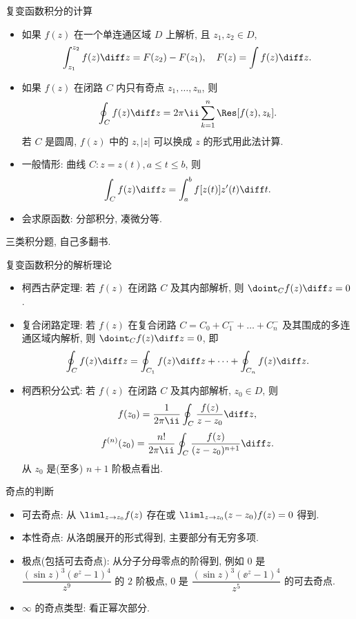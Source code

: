 \documentclass[aspectratio=169,handout]{ctexbeamer}
\begin{document}
\begin{frame}{复变函数积分的计算}
	\beqskip{3pt}
	\begin{itemize}
		\item 如果 $f(z)$ 在一个单连通区域 $D$ 上解析, 且 $z_1,z_2\in D$,
	\[
			\int_{z_1}^{z_2}f(z)\diff z=F(z_2)-F(z_1),\quad
			F(z)=\int f(z)\diff z.
	\]
		\item 如果 $f(z)$ 在闭路 $C$ 内只有奇点 $z_1,\dots,z_n$, 则
	\[
			\oint_C f(z)\diff z=2\pi\ii\sum_{k=1}^n\Res[f(z),z_k].
	\]
		若 $C$ 是圆周, $f(z)$ 中的 $z,|z|$ 可以换成 $z$ 的形式用此法计算.
		\item 一般情形: 曲线 $C:z=z(t),a\le t\le b$, 则
	\[
			\int_C f(z)\diff z=\int_a^b f[z(t)]z'(t)\diff t.
	\]
		\item 会求原函数: 分部积分, 凑微分等.
	\end{itemize}
	\onslide<+->
	\begin{exercise}
		三类积分题, 自己多翻书.
	\end{exercise}
	\endgroup
\end{frame}


\begin{frame}{复变函数积分的解析理论}
	\begin{itemize}
		\item 柯西古萨定理: 若 $f(z)$ 在闭路 $C$ 及其内部解析, 则 $\doint_Cf(z)\diff z=0$.
		\item 复合闭路定理: 若 $f(z)$ 在复合闭路 $C=C_0+C_1^-+\dots+C_n^-$ 及其围成的多连通区域内解析, 则 $\doint_Cf(z)\diff z=0$, 即
	\[
			\oint_Cf(z)\diff z=\oint_{C_1}f(z)\diff z+\cdots+\oint_{C_n}f(z)\diff z.
	\]
		\item 柯西积分公式: 若 $f(z)$ 在闭路 $C$ 及其内部解析, $z_0\in D$, 则
	\[
			f(z_0)=\frac{1}{2\pi\ii}\oint_C\frac{f(z)}{z-z_0}\diff z,
	\]
	\[
			f^{(n)}(z_0)=\frac{n!}{2\pi\ii}\oint_C\frac{f(z)}{(z-z_0)^{n+1}}\diff z.
	\]
		从 $z_0$ 是(至多) $n+1$ 阶极点看出.
	\end{itemize}
\end{frame}


\begin{frame}{奇点的判断}
	\begin{itemize}
		\item 可去奇点: 从 $\liml_{z\to z_0}f(z)$ 存在或 $\liml_{z\to z_0}(z-z_0)f(z)=0$ 得到.
		\item 本性奇点: 从洛朗展开的形式得到, 主要部分有无穷多项.
		\item 极点(包括可去奇点): 从分子分母零点的阶得到, 例如
		$0$ 是 $\dfrac{(\sin z)^3(\ee^z-1)^4}{z^9}$ 的 $2$ 阶极点,
		$0$ 是 $\dfrac{(\sin z)^3(\ee^z-1)^4}{z^5}$ 的可去奇点.
		\item $\infty$ 的奇点类型: 看正幂次部分.
	\end{itemize}
\end{frame}
\end{document}
